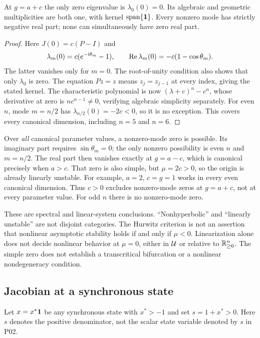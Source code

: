 \begin{proposition}
\label{prop:P03-boundary}
At $g=a+c$ the only zero eigenvalue is $\lambda_0(0)=0$.
Its algebraic and geometric multiplicities are both one, with
kernel $\operatorname{span}\{\mathbf{1}\}$. Every nonzero mode has
strictly negative real part; none can simultaneously have zero real part.
\end{proposition}
\begin{proof}
Here $J(0)=c(P-I)$ and
\[
 \lambda_m(0)=c(e^{-\mathrm{i}\theta_m}-1),\qquad
 \operatorname{Re}\lambda_m(0)=-c(1-\cos\theta_m).
\]
The latter vanishes only for $m=0$. The root-of-unity condition
also shows that only $\lambda_0$ is zero. The equation $Pz=z$
means $z_j=z_{j-1}$ at every index, giving the stated kernel.
The characteristic polynomial is now $(\lambda+c)^n-c^n$,
whose derivative at zero is $n c^{n-1}\ne0$, verifying algebraic
simplicity separately. For even $n$, mode $m=n/2$ has
$\lambda_{n/2}(0)=-2c<0$, so it is no exception. This covers
 every canonical dimension, including $n=5$ and $n=6$.
\end{proof}

\begin{remark}
\label{rem:P03-other-zero}
Over \emph{all} canonical parameter values, a nonzero-mode zero
is possible. Its imaginary part requires $\sin\theta_m=0$;
the only nonzero possibility is even $n$ and $m=n/2$.
The real part then vanishes exactly at $g=a-c$, which is
canonical precisely when $a>c$. That zero is also simple, but
$\mu=2c>0$, so the origin is already linearly unstable. For example,
$a=2$, $c=g=1$ works in every even canonical dimension.
Thus $c>0$ excludes nonzero-mode zeros at $g=a+c$, not at every
parameter value. For odd $n$ there is no nonzero-mode zero.
\end{remark}

These are spectral and linear-system conclusions. ``Nonhyperbolic''
and ``linearly unstable'' are not disjoint categories. The Hurwitz
criterion is not an assertion that nonlinear asymptotic stability
holds if and only if $\mu<0$. Linearization alone does not decide
nonlinear behavior at $\mu=0$, either in $\mathcal{U}$ or relative to
$\mathbb{R}_{\geq 0}^{n}$. The simple zero does not establish a transcritical
bifurcation or a nonlinear nondegeneracy condition.

\subsection{Jacobian at a synchronous state}
\label{slot:P03-3}
Let $x=x^*\mathbf{1}$ be any synchronous state with $x^*>-1$ and set
$s=1+x^*>0$. Here $s$ denotes the positive denominator, not the
scalar state variable denoted by $s$ in P02.

